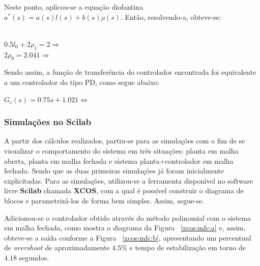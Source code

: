 Neste ponto, aplicou-se a equação diofantina $a^*(s) = a(s)l(s) + b(s)\rho(s)$. Então, resolvendo-a, obteve-se:

\begin{center}
     \vspace{5pt}\\
    $0.5l_0 + 2\rho_1 = 2 \Rightarrow$  \vspace{5pt}\\
    $2\rho_0 = 2.041 \Rightarrow$  \vspace{5pt}
\end{center}

Sendo assim, a função de transferência do controlador encontrada foi equivalente a um controlador do tipo PD, como segue abaixo:

\begin{center}
    $G_c(s) = 0.75s + 1.021 \Leftrightarrow$  \vspace{5pt}
\end{center}

\subsubsection{Simulações no Scilab}

A partir dos cálculos realizados, partiu-se para as simulações com o fim de se visualizar o comportamento do sistema em três situações: planta em malha aberta, planta em malha fechada e sistema planta+controlador em malha fechada. Sendo que as duas primeiras simulações já foram inicialmente explicitadas. Para as simulações, utilizou-se a ferramenta disponível no software livre \textbf{Scilab} chamada \textbf{XCOS}, com a qual é possível construir o diagrama de blocos e parametrizá-los de forma bem simples. Assim, segue-se.

Adicionou-se o controlador obtido através do método polinomial com o sistema em malha fechada, como mostra o diagrama da Figura ~\ref{xcos:mfc:a} e, assim, obteve-se a saída conforme a Figura ~\ref{xcos:mfc:b}, apresentando um percentual de \textit{overshoot} de aproximadamente $4.5\%$ e tempo de estabilização em torno de $4.18$ segundos.

